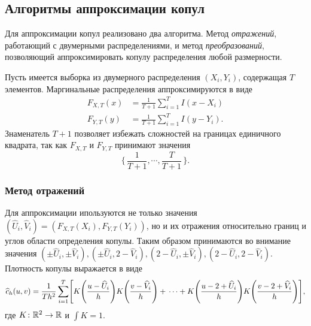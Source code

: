 \subsection*{Алгоритмы аппроксимации копул}

Для аппроксимации копул реализовано два алгоритма. Метод \emph{отражений}\cite{charpentier2007estimation}, работающий с двумерными распределениями, и метод \emph{преобразований}\cite{charpentier2007estimation}, позволяющий аппроксимировать копулу распределения любой размерности.

Пусть имеется выборка из двумерного распределения $(X_i, Y_i)$, содержащая $T$ элементов. Маргинальные распределения аппроксимируются в виде
\begin{align}
F_{X, T}(x) &= \frac{1}{T+1} \sum_{i=1}^T I(x - X_i) \\
F_{Y, T}(y) &= \frac{1}{T+1} \sum_{i=1}^T I(y - Y_i).
\end{align}
Знаменатель $T+1$ позволяет избежать сложностей на границах единичного квадрата, так как $F_{X, T}$ и $F_{Y, T}$ принимают значения
\[
\{\, \frac{1}{T+1}, \cdots, \frac{T}{T+1} \,\}.
\]

\subsubsection*{Метод отражений}

Для аппроксимации ипользуются не только значения $(\widehat{U}_i, \widehat{V}_i) = (F_{X, T}(X_i), F_{Y, T}(Y_i))$, но и их отражения относительно границ и углов области определения копулы. Таким образом принимаются во внимание значения $(\pm\widehat{U}_i, \pm\widehat{V}_i), (\pm\widehat{U}_i, 2 - \widehat{V}_i), (2 - \widehat{U}_i, \pm\widehat{V}_i), (2 - \widehat{U}_i, 2 - \widehat{V}_i)$. Плотность копулы выражается в виде
\begin{equation}
  \widehat{c}_h(u, v)
  = \frac{1}{T h^2} \sum_{i=1}^T \sqts*{K\brts*{\frac{u - \widehat{U}_i}{h}}K\brts*{\frac{v - \widehat{V}_i}{h}} + \\
  \cdots + K\brts*{\frac{u - 2 + \widehat{U}_i}{h}}K\brts*{\frac{v - 2 + \widehat{V}_i}{h}}
  },
\end{equation}
где $K \colon \mathbb{R}^2 \to \mathbb{R}$ и $\int K = 1$.

